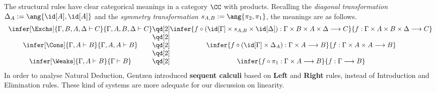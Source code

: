 \documentclass[12pt]{article}
\begin{document}
The structural rules have clear categorical meanings in a category $\CC$ with products. Recalling the \emph{diagonal transformation}
$\Delta_A:=\ang{\id[A],\id[A]}$ and the \emph{symmetry transformation} $s_{A,B}:=\ang{\pi_2,\pi_1}$, the meanings are as follows.
\[\begin{array}{c@{\qd[2]}c}
\infer[\Exchs]{\Gamma , B, A, \Delta \vdash C}{\Gamma , A, B, \Delta  \vdash C} &
\infer{f \circ (\id[\Gamma]\times s_{A, B}\times\id[\Delta]):\Gamma\times B\times A\times\Delta\longrightarrow C}%
            {f:\Gamma\times A \times B \times \Delta \longrightarrow C} \\\\
\infer[\Cons]{\Gamma , A \vdash B}{\Gamma , A, A \vdash B}
& \infer{f\circ(\id[\Gamma]\times\Delta_{A}) : \Gamma \times A \longrightarrow B}{f : \Gamma \times A \times A \longrightarrow B} \\\\
\infer[\Weaks]{\Gamma , A \vdash B}{\Gamma \vdash B} & \infer{f\circ\pi_1:\Gamma \times A \longrightarrow B}{f : \Gamma \longrightarrow B}
\end{array}\]
%
In order to analyse Natural Deduction, Gentzen introduced \textbf{sequent calculi} based on \textbf{Left} and \textbf{Right} rules, instead of Introduction and Elimination rules. These kind of systems are more adequate for our discussion on linearity.
\end{document}
